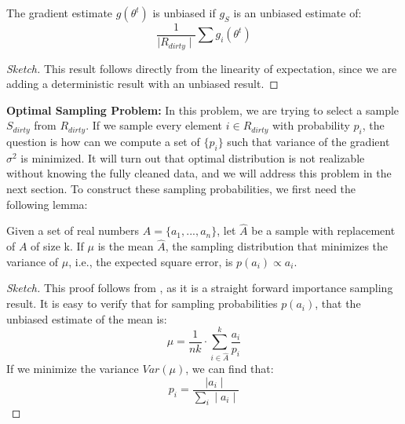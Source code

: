 \begin{lemma}
The gradient estimate $g(\theta^{t})$ is unbiased if $g_S$ is an unbiased estimate of:
\[
\frac{1}{\mid R_{dirty} \mid} \sum g_i(\theta^{t})
\]
\end{lemma}
\begin{proof}[Sketch]
This result follows directly from the linearity of expectation, since we are adding a deterministic result with an unbiased result.
\end{proof}

\vspace{0.5em}

\noindent\textbf{Optimal Sampling Problem: }
In this problem, we are trying to select a sample $S_{dirty}$ from $R_{dirty}$.
If we sample every element $i \in R_{dirty}$ with probability $p_i$, the question is
how can we compute a set of $\{p_i\}$ such that variance of the gradient $\sigma^2$ is minimized.  
It will turn out that optimal distribution is not realizable without knowing the fully cleaned data, and we will address this problem in the next section.
To construct these sampling probabilities, we first need the following lemma:
\begin{lemma}\label{impsample}
Given a set of real numbers $A = \{a_1,...,a_n\}$, let $\hat{A}$ be 
a sample with replacement of $A$ of size k.
If $\mu$ is the mean $\hat{A}$, the sampling distribution that minimizes
 the variance of $\mu$, i.e., the expected square error, is $p(a_i) \propto a_i$.
\end{lemma}
\begin{proof}[Sketch]
This proof follows from \cite{mcbook}, as it is a straight forward importance sampling result.
It is easy to verify that for sampling probabilities $p(a_i)$, that the unbiased
estimate of the mean is:
\[
\mu = \frac{1}{nk}\cdot\sum_{i\in\hat{A}}^k \frac{a_i}{p_i}
\]
If we minimize the variance $Var(\mu)$, we can find that:
\[
p_i = \frac{\mid a_i \mid }{\sum_i \mid a_i \mid}
\]
\end{proof}

